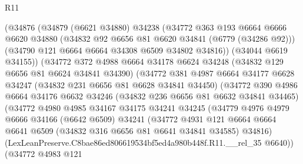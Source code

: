 \begin{lexlean}{R11}
\begin{coremodule}
                    (@34876
                      (@34879
                        (@6621 @34880)
                        @34238
                        (@34772
                          @363
                          @193
                          @6664
                          @6666
                          @6620
                          @34880
                          (@34832 @92 @6656 @81 @6620 @34841 (@6779 (@34286 @92)))
                          (@34790 @121 @6664 @6664 @34308 @6509 @34802 @34816))
                        (@34044 @6619 @34155))
                      (@34772
                        @372
                        @4988
                        @6664
                        @34178
                        @6624
                        @34248
                        (@34832 @129 @6656 @81 @6624 @34841 @34390)
                        (@34772
                          @381
                          @4987
                          @6664
                          @34177
                          @6628
                          @34247
                          (@34832 @231 @6656 @81 @6628 @34841 @34450)
                          (@34772
                            @390
                            @4986
                            @6664
                            @34176
                            @6632
                            @34246
                            (@34832 @236 @6656 @81 @6632 @34841 @34465)
                            (@34772
                              @4980
                              @4985
                              @34167
                              @34175
                              @34241
                              @34245
                              (@34779
                                @4976
                                @4979
                                @6666
                                @34166
                                (@6642 @6509)
                                @34241
                                (@34772
                                  @4931
                                  @121
                                  @6664
                                  @6664
                                  @6641
                                  @6509
                                  (@34832 @316 @6656 @81 @6641 @34841 @34585)
                                  @34816)
                                (LexLeanPreserve.C8bae86ed806619534bf5ed4a980b448f.R11.__rel_35
                                  @6640))
                              (@34772
                                @4983
                                @121

\end{coremodule}
\end{lexlean}
